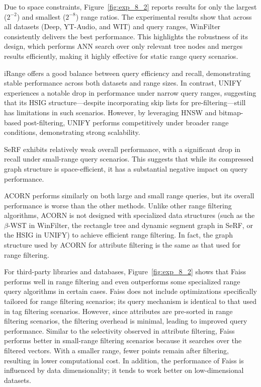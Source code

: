 \documentclass[sigconf, nonacm]{acmart}
\begin{document}
	Due to space constraints, Figure~\ref{fig:exp_8_2} reports results for only the largest ($2^{-2}$) and smallest ($2^{-8}$) range ratios. The experimental results show that across all datasets (Deep, YT-Audio, and WIT) and query ranges, WinFilter consistently delivers the best performance. This highlights the robustness of its design, which performs ANN search over only relevant tree nodes and merges results efficiently, making it highly effective for static range query scenarios.
	
	iRange offers a good balance between query efficiency and recall, demonstrating stable performance across both datasets and range sizes. In contrast, UNIFY experiences a notable drop in performance under narrow query ranges, suggesting that its HSIG structure—despite incorporating skip lists for pre-filtering—still has limitations in such scenarios. However, by leveraging HNSW and bitmap-based post-filtering, UNIFY performs competitively under broader range conditions, demonstrating strong scalability.
	
	SeRF exhibits relatively weak overall performance, with a significant drop in recall under small-range query scenarios. This suggests that while its compressed graph structure is space-efficient, it has a substantial negative impact on query performance.
	
	ACORN performs similarly on both large and small range queries, but its overall performance is worse than the other methods. Unlike other range filtering algorithms, ACORN is not designed with specialized data structures (such as the $\beta$-WST in WinFilter, the rectangle tree and dynamic segment graph in SeRF, or the HSIG in UNIFY) to achieve efficient range filtering. In fact, the graph structure used by ACORN for attribute filtering is the same as that used for range filtering.
	
	For third-party libraries and databases, Figure~\ref{fig:exp_8_2} shows that Faiss performs well in range filtering and even outperforms some specialized range query algorithms in certain cases. Faiss does not include optimizations specifically tailored for range filtering scenarios; its query mechanism is identical to that used in tag filtering scenarios. However, since attributes are pre-sorted in range filtering scenarios, the filtering overhead is minimal, leading to improved query performance. Similar to the selectivity observed in attribute filtering, Faiss performs better in small-range filtering scenarios because it searches over the filtered vectors. With a smaller range, fewer points remain after filtering, resulting in lower computational cost. In addition, the performance of Faiss is influenced by data dimensionality; it tends to work better on low-dimensional datasets.
	
\end{document}
